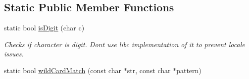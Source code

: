 \subsection*{Static Public Member Functions}
\begin{DoxyCompactItemize}
\item 
static bool \hyperlink{classel_1_1base_1_1utils_1_1Str_a4caae91dfe0310d9f182bd9b7e99103c}{is\+Digit} (char c)\hypertarget{classel_1_1base_1_1utils_1_1Str_a4caae91dfe0310d9f182bd9b7e99103c}{}\label{classel_1_1base_1_1utils_1_1Str_a4caae91dfe0310d9f182bd9b7e99103c}

\begin{DoxyCompactList}\small\item\em Checks if character is digit. Dont use libc implementation of it to prevent locale issues. \end{DoxyCompactList}\item 
static bool \hyperlink{classel_1_1base_1_1utils_1_1Str_a95e007a25dfcbd77d4c573b0f73b3153}{wild\+Card\+Match} (const char $\ast$str, const char $\ast$pattern)\hypertarget{classel_1_1base_1_1utils_1_1Str_a95e007a25dfcbd77d4c573b0f73b3153}{}\label{classel_1_1base_1_1utils_1_1Str_a95e007a25dfcbd77d4c573b0f73b3153}


\end{DoxyCompactItemize}
